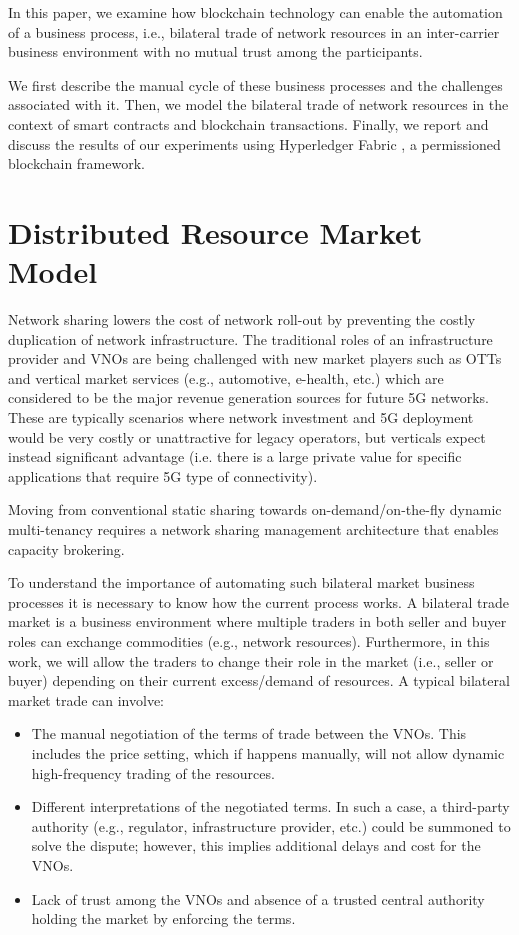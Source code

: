 \documentclass[conference]{IEEEtran}
\begin{document}
In this paper, we examine how blockchain technology can enable the automation of a business process, i.e., bilateral trade of network resources in an inter-carrier business environment with no mutual trust among the participants.

We first describe the manual cycle of these business processes and the challenges associated with it. Then, we model the bilateral trade of network resources in the context of smart contracts and blockchain transactions. Finally, we report and discuss the results of our experiments using Hyperledger Fabric \cite{Fabric}, a permissioned blockchain framework.


\section{Distributed Resource Market Model}
Network sharing lowers the cost of network roll-out by preventing the costly duplication of network infrastructure. The traditional roles of an infrastructure provider and VNOs are being challenged with new market players such as OTTs and vertical market services (e.g., automotive, e-health, etc.) which are considered to be the major revenue generation sources for future 5G networks.
These are typically scenarios where network investment and 5G deployment would be very costly or unattractive for legacy operators, but verticals expect instead significant advantage (i.e. there is a large private value for specific applications that require 5G type of connectivity).

Moving from conventional static sharing towards on-demand/on-the-fly dynamic multi-tenancy \cite{7514161} requires a network sharing management architecture that enables capacity brokering.

To understand the importance of automating such bilateral market business processes it is necessary to know how the current process works.
A bilateral trade market is a business environment where multiple traders in both seller and buyer roles can exchange commodities (e.g., network resources). Furthermore, in this work, we will allow the traders to change their role in the market (i.e., seller or buyer) depending on their current excess/demand of resources.
A typical bilateral market trade can involve: 
\begin{itemize}
    \item The manual negotiation of the terms of trade between the VNOs. This includes the price setting, which if happens manually, will not allow dynamic high-frequency trading of the resources.
    \item Different interpretations of the negotiated terms. In such a case, a third-party authority (e.g., regulator, infrastructure provider, etc.) could be summoned to solve the dispute; however, this implies additional delays and cost for the VNOs.
    \item Lack of trust among the VNOs and absence of a trusted central authority holding the market by enforcing the terms. 
\end{itemize}
\end{document}
